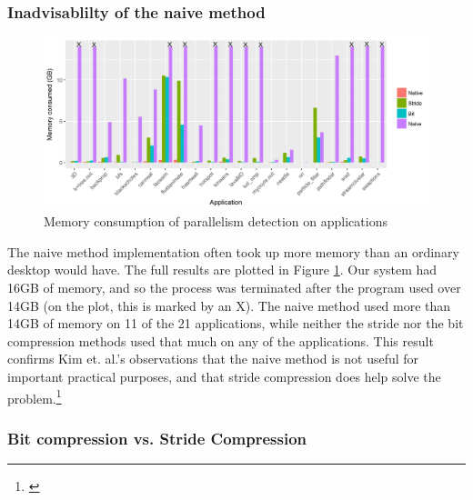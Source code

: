 \documentclass[12pt,twoside]{reedthesis}
\begin{document}
		\subsubsection{Inadvisablilty of the naive method}
		
		
		\begin{figure}
			\caption{Memory consumption of parallelism detection on applications}
			\label{fig:mem-comp-plot}
			\includegraphics[scale=0.7]{plots/overall_plot.png}
		\end{figure}
		
		The naive method implementation often took up more memory than an ordinary desktop would have. The full results are plotted in Figure \ref{fig:mem-comp-plot}. Our system had 16GB of memory, and so the process was terminated after the program used over 14GB (on the plot, this is marked by an X). The naive method used more than 14GB of memory on 11 of the 21 applications, while neither the stride nor the bit compression methods used that much on any of the applications. This result confirms Kim et. al.'s observations that the naive method is not useful for important practical purposes, and that stride compression does help solve the problem.\footnote{\cite{Kim:2010}}
		
		
		
		\subsubsection{Bit compression vs. Stride Compression}
		
\end{document}
